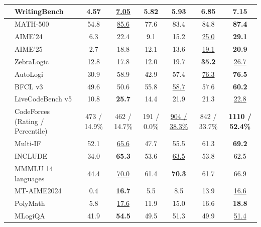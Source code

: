 \begin{table}[tbp]
{\begin{tabular}{@{}clcccccc@{}}
& WritingBench & 4.57 & \underline{7.05} & 5.82 & 5.93 & 6.85 & \textbf{7.15} \\
\midrule
{} & MATH-500 & 54.8 & \underline{85.6} & 77.6 & 83.4 & 84.8 & \textbf{87.4} \\
& AIME'24 & 6.3 & 22.4 & 9.1 & 15.2 & \underline{25.0} & \textbf{29.1} \\
& AIME'25 & 2.7 & 18.8 & 12.1 & 13.6 & \underline{19.1} & \textbf{20.9} \\
& ZebraLogic & 12.8 & 17.8 & 12.0 & 19.7 & \textbf{35.2} & \underline{26.7} \\
& AutoLogi & 30.9 & 58.9 & 42.9 & 57.4 & \underline{76.3} & \textbf{76.5} \\
\midrule
{} & BFCL v3 & 49.6 & 50.6 & 55.8 & \underline{58.7} & 57.6 & \textbf{60.2} \\
& LiveCodeBench v5 & 10.8 & \textbf{25.7} & 14.4 & 21.9 & 21.3 & \underline{22.8} \\
& CodeForces {\tiny{(Rating / Percentile)}} & 473 / 14.9\% & 462 / 14.7\% & 191 / 0.0\% & \underline{904 / 38.3\%} & 842 / 33.7\% & \textbf{1110 / 52.4\%} \\
\midrule
{} & Multi-IF & 52.1 & \underline{65.6} & 47.7 & 55.5 & 61.3 & \textbf{69.2} \\
& INCLUDE & 34.0 & \textbf{65.3} & 53.6 & \underline{63.5} & 53.8 & 62.5 \\
& MMMLU {\tiny{14 languages}} & 44.4 & \underline{70.0} & 61.4 & \textbf{70.3} & 61.7 & 66.9 \\
& MT-AIME2024 & 0.4 & \textbf{16.7} & 5.5 & 8.5 & 13.9 & \underline{16.6} \\
& PolyMath & 5.8 & \underline{17.6} & 11.9 & 15.0 & 16.6 & \textbf{18.8} \\
& MLogiQA & 41.9 & \textbf{54.5} & 49.5 & 51.3 & 49.9 & \underline{51.4} \\
\bottomrule
\end{tabular}
}
\end{table}


